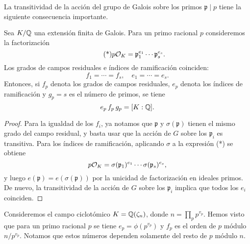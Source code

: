 La transitividad de la acción del grupo de Galois sobre los primos
$\mathfrak{p} \mid p$ tiene la siguiente consecuencia importante.

\begin{proposicion}
  Sea $K/\mathbb{Q}$ una extensión finita de Galois. Para un primo racional $p$
  consideremos la factorización
  \[ \tag{*} p \mathcal{O}_K = \mathfrak{p}_1^{e_1} \cdots \mathfrak{p}_s^{e_s}. \]
  Los grados de campos residuales e índices de ramificación coinciden:
  $$f_1 = \cdots = f_s, \quad e_1 = \cdots = e_s.$$
  Entonces, si $f_p$ denota los grados de campos residuales,
  $e_p$ denota los índices de ramificación y $g_p = s$ es el número de primos,
  se tiene
  $$e_p\,f_p\,g_p = [K : \mathbb{Q}].$$

  \begin{proof}
    Para la igualdad de los $f_i$, ya notamos que $\mathfrak{p}$ y
    $\sigma (\mathfrak{p})$ tienen el mismo grado del campo residual,
    y basta usar que la acción de $G$ sobre los $\mathfrak{p}_i$ es transitiva.
    Para los índices de ramificación, aplicando $\sigma$ a la expresión (*)
    se obtiene
    $$p\mathcal{O}_K = \sigma (\mathfrak{p}_1)^{e_1} \cdots \sigma (\mathfrak{p}_s)^{e_s},$$
    y luego $e (\mathfrak{p}) = e (\sigma (\mathfrak{p}))$ por la unicidad de
    factorización en ideales primos. De nuevo, la transitividad de la acción
    de $G$ sobre los $\mathfrak{p}_i$ implica que todos los $e_i$ coinciden.
  \end{proof}
\end{proposicion}

\begin{ejemplo}
  Consideremos el campo ciclotómico $K = \mathbb{Q} (\zeta_n)$, donde
  $n = \prod_p p^{v_p}$. Hemos visto que para un primo racional $p$
  se tiene $e_p = \phi (p^{v_p})$ y $f_p$ es el orden de $p$ módulo
  $n/p^{v_p}$. Notamos que estos números dependen solamente del resto de $p$
  módulo $n$.
\end{ejemplo}

